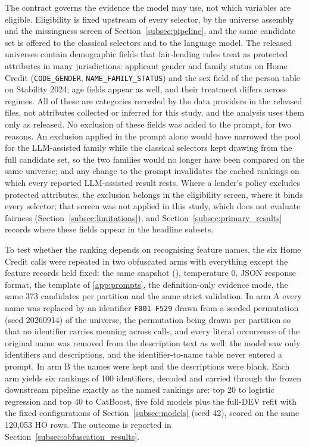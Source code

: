 \documentclass[final,5p,twocolumn]{elsarticle}
\begin{document}
The contract governs the evidence the model may use, not which variables are eligible. Eligibility is fixed upstream of every selector, by the universe assembly and the missingness screen of Section~\ref{subsec:pipeline}, and the same candidate set is offered to the classical selectors and to the language model. The released universes contain demographic fields that fair-lending rules treat as protected attributes in many jurisdictions: applicant gender and family status on Home Credit (\texttt{CODE\_GENDER}, \texttt{NAME\_FAMILY\_STATUS}) and the sex field of the person table on Stability 2024; age fields appear as well, and their treatment differs across regimes. All of these are categories recorded by the data providers in the released files, not attributes collected or inferred for this study, and the analysis uses them only as released. No exclusion of these fields was added to the prompt, for two reasons. An exclusion applied in the prompt alone would have narrowed the pool for the LLM-assisted family while the classical selectors kept drawing from the full candidate set, so the two families would no longer have been compared on the same universe; and any change to the prompt invalidates the cached rankings on which every reported LLM-assisted result rests. Where a lender's policy excludes protected attributes, the exclusion belongs in the eligibility screen, where it binds every selector; that screen was not applied in this study, which does not evaluate fairness (Section~\ref{subsec:limitations}), and Section~\ref{subsec:primary_results} records where these fields appear in the headline subsets.

To test whether the ranking depends on recognising feature names, the six Home Credit calls were repeated in two obfuscated arms with everything except the feature records held fixed: the same snapshot (), temperature 0, JSON response format, the template of \ref{app:prompts}, the definition-only evidence mode, the same 373 candidates per partition and the same strict validation. In arm A every name was replaced by an identifier \texttt{F001}--\texttt{F529} drawn from a seeded permutation (seed 20260914) of the universe, the permutation being drawn per partition so that no identifier carries meaning across calls, and every literal occurrence of the original name was removed from the description text as well; the model saw only identifiers and descriptions, and the identifier-to-name table never entered a prompt. In arm B the names were kept and the descriptions were blank. Each arm yields six rankings of 100 identifiers, decoded and carried through the frozen downstream pipeline exactly as the named rankings are: top 20 to logistic regression and top 40 to CatBoost, five fold models plus the full-DEV refit with the fixed configurations of Section~\ref{subsec:models} (seed 42), scored on the same 120,053 HO rows. The outcome is reported in Section~\ref{subsec:obfuscation_results}.
\end{document}
